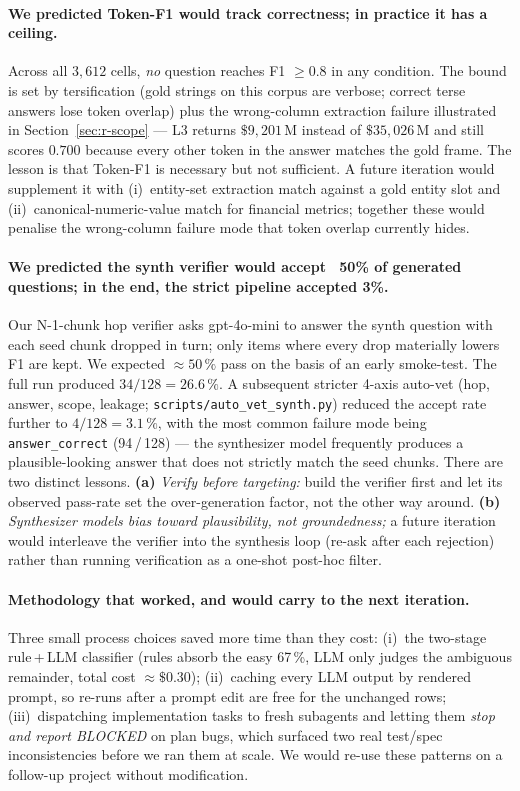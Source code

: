 \documentclass[11pt]{article}
\begin{document}
\paragraph{We predicted Token-F1 would track correctness; in
practice it has a ceiling.}
Across all $3{,}612$ cells, \emph{no} question reaches
F1 $\geq 0.8$ in any condition. The bound is set by tersification
(gold strings on this corpus are verbose; correct terse answers
lose token overlap) plus the wrong-column extraction failure
illustrated in Section~\ref{sec:r-scope} --- L3 returns
$\$9{,}201$\,M instead of $\$35{,}026$\,M and still scores $0.700$
because every other token in the answer matches the gold frame.
The lesson is that Token-F1 is necessary but not sufficient. A
future iteration would supplement it with (i)~entity-set extraction
match against a gold entity slot and (ii)~canonical-numeric-value
match for financial metrics; together these would penalise the
wrong-column failure mode that token overlap currently hides.

\paragraph{We predicted the synth verifier would accept ~50\% of generated questions; in the end, the strict pipeline accepted 3\%.}
Our N-1-chunk hop verifier asks gpt-4o-mini to answer the synth
question with each seed chunk dropped in turn; only items where every
drop materially lowers F1 are kept. We expected $\approx 50\,\%$ pass
on the basis of an early smoke-test. The full run produced
$34/128 = 26.6\,\%$. A subsequent stricter 4-axis auto-vet
(hop, answer, scope, leakage; \texttt{scripts/auto\_vet\_synth.py})
reduced the accept rate further to $4/128 = 3.1\,\%$, with the most
common failure mode being \texttt{answer\_correct} (94\,/\,128) ---
the synthesizer model frequently produces a plausible-looking
answer that does not strictly match the seed chunks.
There are two distinct lessons. \textbf{(a)} \emph{Verify before
targeting:} build the verifier first and let its observed pass-rate
set the over-generation factor, not the other way around.
\textbf{(b)} \emph{Synthesizer models bias toward plausibility, not
groundedness;} a future iteration would interleave the verifier into
the synthesis loop (re-ask after each rejection) rather than running
verification as a one-shot post-hoc filter.

\paragraph{Methodology that worked, and would carry to the next iteration.}
Three small process choices saved more time than they cost: (i)~the
two-stage rule\,+\,LLM classifier (rules absorb the easy 67\,\%, LLM
only judges the ambiguous remainder, total cost $\approx \$0.30$);
(ii)~caching every LLM output by rendered prompt, so re-runs after a
prompt edit are free for the unchanged rows; (iii)~dispatching
implementation tasks to fresh subagents and letting them \emph{stop
and report BLOCKED} on plan bugs, which surfaced two real test/spec
inconsistencies before we ran them at scale. We would re-use these
patterns on a follow-up project without modification.
\end{document}
